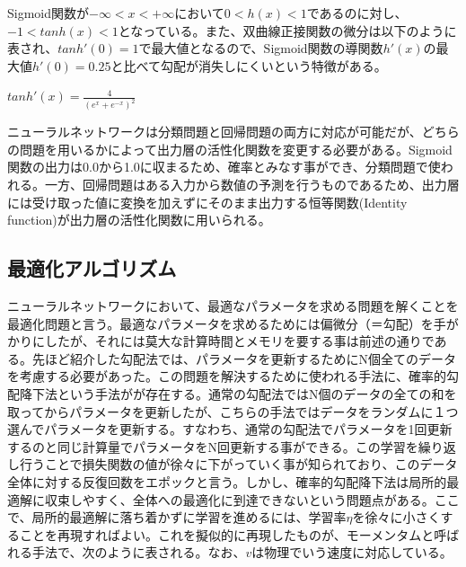 \documentclass{article}
\begin{document}
Sigmoid関数が\begin{math}-\infty<x<+\infty\end{math}において\begin{math}0<h(x)<1\end{math}であるのに対し、\begin{math}-1<tanh(x)<1\end{math}となっている。また、双曲線正接関数の微分は以下のように表され、\begin{math}tanh'(0)=1\end{math}で最大値となるので、Sigmoid関数の導関数\begin{math}h'(x)\end{math}の最大値\begin{math}h'(0)=0.25\end{math}と比べて勾配が消失しにくいという特徴がある。

\begin{center}
\begin{math}
tanh'(x) =  \frac{4} {(e^x+e^{-x})^{2}} 
\end{math}
\end{center}

ニューラルネットワークは分類問題と回帰問題の両方に対応が可能だが、どちらの問題を用いるかによって出力層の活性化関数を変更する必要がある。Sigmoid関数の出力は0.0から1.0に収まるため、確率とみなす事ができ、分類問題で使われる。一方、回帰問題はある入力から数値の予測を行うものであるため、出力層には受け取った値に変換を加えずにそのまま出力する恒等関数(Identity function)が出力層の活性化関数に用いられる。


\subsection{最適化アルゴリズム}

ニューラルネットワークにおいて、最適なパラメータを求める問題を解くことを最適化問題と言う。最適なパラメータを求めるためには偏微分（＝勾配）を手がかりにしたが、それには莫大な計算時間とメモリを要する事は前述の通りである。先ほど紹介した勾配法では、パラメータを更新するためにN個全てのデータを考慮する必要があった。この問題を解決するために使われる手法に、確率的勾配降下法という手法がが存在する。通常の勾配法ではN個のデータの全ての和を取ってからパラメータを更新したが、こちらの手法ではデータをランダムに１つ選んでパラメータを更新する。すなわち、通常の勾配法でパラメータを1回更新するのと同じ計算量でパラメータをN回更新する事ができる。この学習を繰り返し行うことで損失関数の値が徐々に下がっていく事が知られており、このデータ全体に対する反復回数をエポックと言う。しかし、確率的勾配降下法は局所的最適解に収束しやすく、全体への最適化に到達できないという問題点がある。ここで、局所的最適解に落ち着かずに学習を進めるには、学習率\begin{math}\eta\end{math}を徐々に小さくすることを再現すればよい。これを擬似的に再現したものが、モーメンタムと呼ばれる手法で、次のように表される。なお、\begin{math}v\end{math}は物理でいう速度に対応している。
\end{document}

